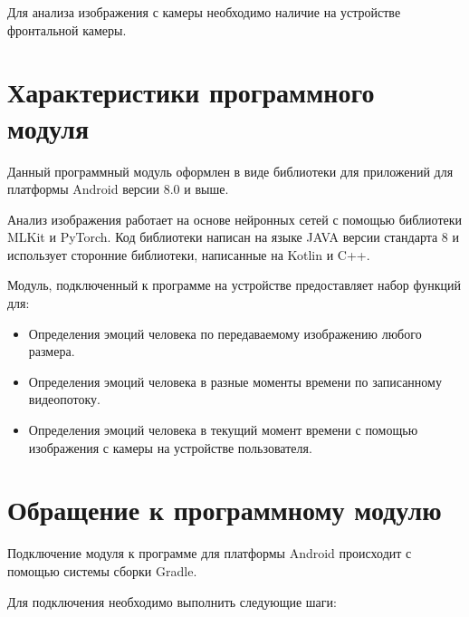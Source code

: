 \documentclass[a4paper,12pt]{article}
\begin{document}
    Для анализа изображения с камеры необходимо наличие на устройстве фронтальной камеры.

    \newpage

    \section{Характеристики программного модуля}

    Данный программный модуль оформлен в виде библиотеки для приложений для платформы Android версии 8.0 и выше.

    Анализ изображения работает на основе нейронных сетей с помощью библиотеки MLKit и PyTorch.
    Код библиотеки написан на языке JAVA версии стандарта 8 и использует сторонние библиотеки, написанные на Kotlin и C++.

    Модуль, подключенный к программе на устройстве предоставляет набор функций для:
    \begin{itemize}
        \item Определения эмоций человека по передаваемому изображению любого размера.
        \item Определения эмоций человека в разные моменты времени по записанному видеопотоку.
        \item Определения эмоций человека в текущий момент времени с помощью изображения с камеры на устройстве пользователя.
    \end{itemize}

    \newpage

    \section{Обращение к программному модулю}

    Подключение модуля к программе для платформы Android происходит с помощью системы сборки Gradle.

    Для подключения необходимо выполнить следующие шаги:
\end{document}
